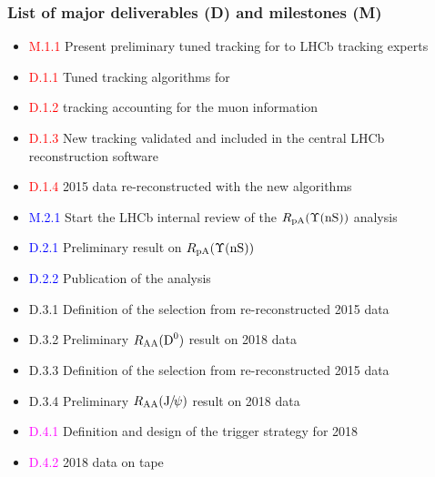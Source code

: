 \documentclass[a4paper,11pt]{article}
\begin{document}

\subsubsection*{List of major deliverables (D) and milestones (M)}

\begin{itemize}
 \item \textcolor{red}{M.1.1} Present preliminary tuned tracking for \pbpb to LHCb tracking experts
 \item \textcolor{red}{D.1.1} Tuned tracking algorithms for \pbpb
 \item \textcolor{red}{D.1.2} \pbpb tracking accounting for the muon information
 \item \textcolor{red}{D.1.3} New \pbpb tracking validated and included in the central LHCb reconstruction software
 \item \textcolor{red}{D.1.4} 2015 data re-reconstructed with the new algorithms
 \item \textcolor{blue}{M.2.1} Start the LHCb internal review of the $R_{\text{pA}} (\Upsilon\text{(nS)})$ analysis
 \item \textcolor{blue}{D.2.1} Preliminary result on $R_{\text{pA}} (\Upsilon\text{(nS)})$
 \item \textcolor{blue}{D.2.2} Publication of the analysis
 \item \textcolor{green!50!black}{D.3.1} Definition of the \Dz selection from re-reconstructed 2015 \pbpb data
 \item \textcolor{green!50!black}{D.3.2} Preliminary $R_{\text{AA}}(\text{D}^0)$ result on 2018 \pbpb data
 \item \textcolor{green!50!black}{D.3.3} Definition of the \Jpsi selection from re-reconstructed 2015 \pbpb data
 \item \textcolor{green!50!black}{D.3.4} Preliminary $R_{\text{AA}}(\text{J}\hspace{-.08em}/\hspace{-.14em}\psi)$ result on 2018 \pbpb data
 \item \textcolor{magenta}{D.4.1} Definition and design of the trigger strategy for 2018 \pbpb
 \item \textcolor{magenta}{D.4.2} 2018 \pbpb data on tape
\end{itemize}
\end{document}
